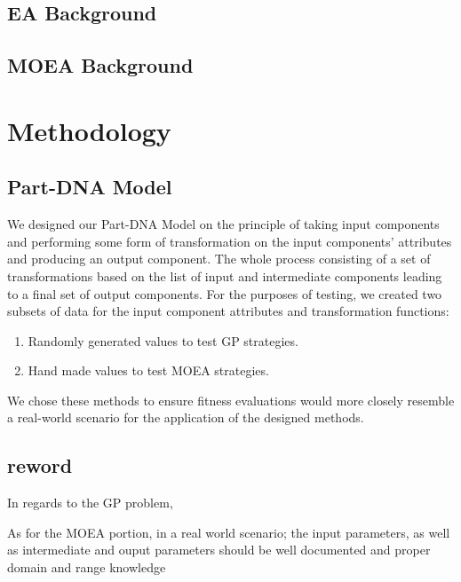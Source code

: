 \documentclass{IEEEtran}
\begin{document}
\subsection{EA Background}

\subsection{MOEA Background}

\section{Methodology}
\subsection{Part-DNA Model}
We designed our Part-DNA Model on the principle of taking input components and performing some form of transformation on the input components' attributes and producing an output component. The whole process consisting of a set of transformations based on the list of input and intermediate components leading to a final set of output components. For the purposes of testing, we created two subsets of data for the input component attributes and transformation functions:
\begin{enumerate}
\item Randomly generated values to test GP strategies.
\item Hand made values to test MOEA strategies.
\end{enumerate}
We chose these methods to ensure fitness evaluations would more closely resemble a real-world scenario for the application of the designed methods.

\subsection{reword}
In regards to the GP problem,

As for the MOEA portion, in a real world scenario; the input parameters, as well as intermediate and ouput parameters should be well documented and proper domain and range knowledge
\end{document}
